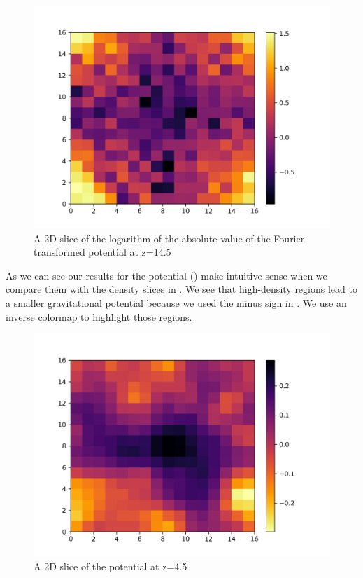 \documentclass[a4paper,10pt]{article}
\begin{document}
\begin{figure}[H]
  \centering
  \includegraphics[width=.8\linewidth]{./plots/fourier_14.5.png}
  \caption{A 2D slice of the logarithm of the absolute value of the Fourier-transformed potential at z=14.5}
  \label{fig:four_14}
\end{figure}

As we can see our results for the potential () make intuitive sense when we compare them with the density slices in . We see that high-density regions lead to a smaller gravitational potential because we used the minus sign in . We use an inverse colormap to highlight those regions. 

\begin{figure}[H]
  \centering
  \includegraphics[width=.8\linewidth]{./plots/potential_4.5.png}
  \caption{A 2D slice of the potential at z=4.5}
  \label{fig:for_4}
\end{figure}
\end{document}
